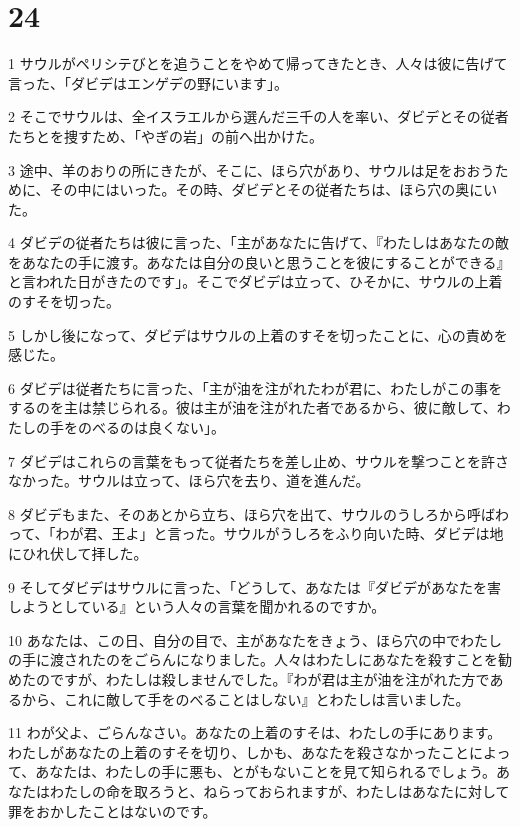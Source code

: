 \chapter{24}

\par 1 サウルがペリシテびとを追うことをやめて帰ってきたとき、人々は彼に告げて言った、「ダビデはエンゲデの野にいます」。
\par 2 そこでサウルは、全イスラエルから選んだ三千の人を率い、ダビデとその従者たちとを捜すため、「やぎの岩」の前へ出かけた。
\par 3 途中、羊のおりの所にきたが、そこに、ほら穴があり、サウルは足をおおうために、その中にはいった。その時、ダビデとその従者たちは、ほら穴の奥にいた。
\par 4 ダビデの従者たちは彼に言った、「主があなたに告げて、『わたしはあなたの敵をあなたの手に渡す。あなたは自分の良いと思うことを彼にすることができる』と言われた日がきたのです」。そこでダビデは立って、ひそかに、サウルの上着のすそを切った。
\par 5 しかし後になって、ダビデはサウルの上着のすそを切ったことに、心の責めを感じた。
\par 6 ダビデは従者たちに言った、「主が油を注がれたわが君に、わたしがこの事をするのを主は禁じられる。彼は主が油を注がれた者であるから、彼に敵して、わたしの手をのべるのは良くない」。
\par 7 ダビデはこれらの言葉をもって従者たちを差し止め、サウルを撃つことを許さなかった。サウルは立って、ほら穴を去り、道を進んだ。
\par 8 ダビデもまた、そのあとから立ち、ほら穴を出て、サウルのうしろから呼ばわって、「わが君、王よ」と言った。サウルがうしろをふり向いた時、ダビデは地にひれ伏して拝した。
\par 9 そしてダビデはサウルに言った、「どうして、あなたは『ダビデがあなたを害しようとしている』という人々の言葉を聞かれるのですか。
\par 10 あなたは、この日、自分の目で、主があなたをきょう、ほら穴の中でわたしの手に渡されたのをごらんになりました。人々はわたしにあなたを殺すことを勧めたのですが、わたしは殺しませんでした。『わが君は主が油を注がれた方であるから、これに敵して手をのべることはしない』とわたしは言いました。
\par 11 わが父よ、ごらんなさい。あなたの上着のすそは、わたしの手にあります。わたしがあなたの上着のすそを切り、しかも、あなたを殺さなかったことによって、あなたは、わたしの手に悪も、とがもないことを見て知られるでしょう。あなたはわたしの命を取ろうと、ねらっておられますが、わたしはあなたに対して罪をおかしたことはないのです。
